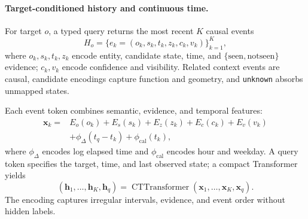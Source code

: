 \paragraph{Target-conditioned history and continuous time.}
For target $o$, a typed query returns the most recent $K$ causal events
\begin{equation}
H_o=\{e_k=(o_k,s_k,t_k,z_k,c_k,v_k)\}_{k=1}^{K},
\label{eq:history}
\end{equation}
where $o_k,s_k,t_k,z_k$ encode entity, candidate state, time, and
$\{\mathrm{seen},\mathrm{notseen}\}$ evidence; $c_k,v_k$ encode confidence and
visibility. Related context events are causal, candidate encodings capture
function and geometry, and \texttt{unknown} absorbs unmapped states.

Each event token combines semantic, evidence, and temporal features:
\begin{align}
\mathbf x_k={}&E_o(o_k)+E_s(s_k)+E_z(z_k)+E_c(c_k)+E_v(v_k)\nonumber\\
&+\phi_{\Delta}(t_q-t_k)+\phi_{\mathrm{cal}}(t_k),
\label{eq:eventtoken}
\end{align}
where $\phi_{\Delta}$ encodes log elapsed time and $\phi_{\mathrm{cal}}$ encodes
hour and weekday. A query token specifies the target, time, and last observed state; a compact
Transformer yields
\begin{equation}
(\mathbf h_1,\ldots,\mathbf h_K,\mathbf h_q)
=\operatorname{CTTransformer}(\mathbf x_1,\ldots,\mathbf x_K,\mathbf x_q).
\label{eq:history-encoder}
\end{equation}
The encoding captures irregular intervals, evidence, and event order without hidden labels.


